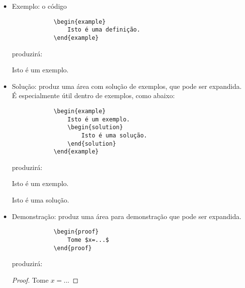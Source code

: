 \begin{itemize}
    \item Exemplo: o código
        \begin{verbatim}
            \begin{example}
                Isto é uma definição.
            \end{example}\end{verbatim}
        produzirá:
        \begin{example}
            Isto é um exemplo.
        \end{example}
        
    \item Solução: produz uma área com solução de exemplos, que pode ser expandida. É especialmente útil dentro de exemplos, como abaixo:
        \begin{verbatim}
            \begin{example}
                Isto é um exemplo.
                \begin{solution}
                    Isto é uma solução.
                \end{solution}
            \end{example}\end{verbatim}
        produzirá:
        \begin{example}
            Isto é um exemplo.
            \begin{solution}
                Isto é uma solução.
            \end{solution}
        \end{example}
    
    \item Demonstração: produz uma área para demonstração que pode ser expandida.
        \begin{verbatim}
            \begin{proof}
                Tome $x=...$
            \end{proof}\end{verbatim}
        produzirá:
            \begin{proof}
                Tome $x=...$
            \end{proof}
        
\end{itemize}
    
	